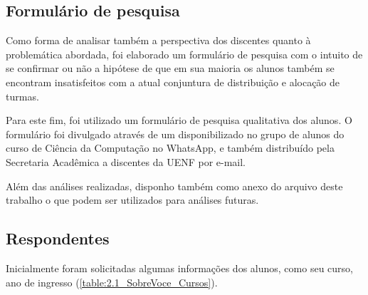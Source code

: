\begin{apendicesenv} %

  \chapter{Formulário de pesquisa} \label{chap:Formulário de pesquisa}


  Como forma de analisar também a perspectiva dos discentes quanto à problemática abordada, foi elaborado um formulário de pesquisa com o intuito de se confirmar ou não a hipótese de que em sua maioria os alunos também se encontram insatisfeitos com a atual conjuntura de distribuição e alocação de turmas.

  Para este fim, foi utilizado um formulário de pesquisa qualitativa dos alunos. O formulário foi divulgado através de um  disponibilizado no grupo de alunos do curso de Ciência da Computação no WhatsApp, e também distribuído pela Secretaria Acadêmica a discentes da UENF por e-mail.

  Além das análises realizadas, disponho também como anexo do arquivo deste trabalho o
  que podem ser utilizados para análises futuras.

  \section*{Respondentes} \label{sec:Respondentes}

  Inicialmente foram solicitadas algumas informações dos alunos, como seu curso, ano de ingresso (\autoref{table:2.1_SobreVoce_Cursos}).


\end{apendicesenv}
